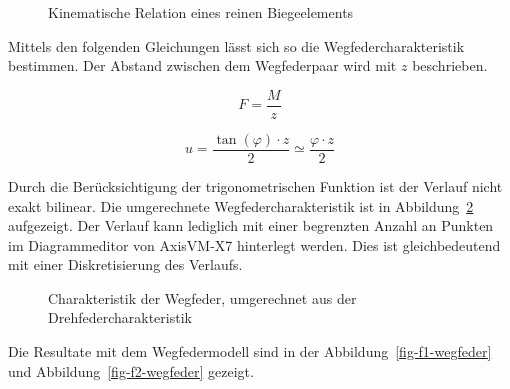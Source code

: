\documentclass[
  11pt,
  letterpaper,
]{scrreprt}
\begin{document}
\begin{figure}[H]


\caption{\label{fig-verdrehung_verformung}Kinematische Relation eines
reinen Biegeelements}

\end{figure}%

Mittels den folgenden Gleichungen lässt sich so die
Wegfedercharakteristik bestimmen. Der Abstand zwischen dem Wegfederpaar
wird mit \(z\) beschrieben.

\[
F = \frac{M}{z}
\]

\[
u = \frac{\tan(\varphi) \cdot z}{2} \simeq \frac{\varphi \cdot z}{2}
\]

Durch die Berücksichtigung der trigonometrischen Funktion ist der
Verlauf nicht exakt bilinear. Die umgerechnete Wegfedercharakteristik
ist in Abbildung~\ref{fig-wegfeder-force} aufgezeigt. Der Verlauf kann
lediglich mit einer begrenzten Anzahl an Punkten im Diagrammeditor von
AxisVM-X7 hinterlegt werden. Dies ist gleichbedeutend mit einer
Diskretisierung des Verlaufs.

\begin{figure}[H]


\caption{\label{fig-wegfeder-force}Charakteristik der Wegfeder,
umgerechnet aus der Drehfedercharakteristik}

\end{figure}%

Die Resultate mit dem Wegfedermodell sind in der
Abbildung~\ref{fig-f1-wegfeder} und Abbildung~\ref{fig-f2-wegfeder}
gezeigt.
\end{document}

